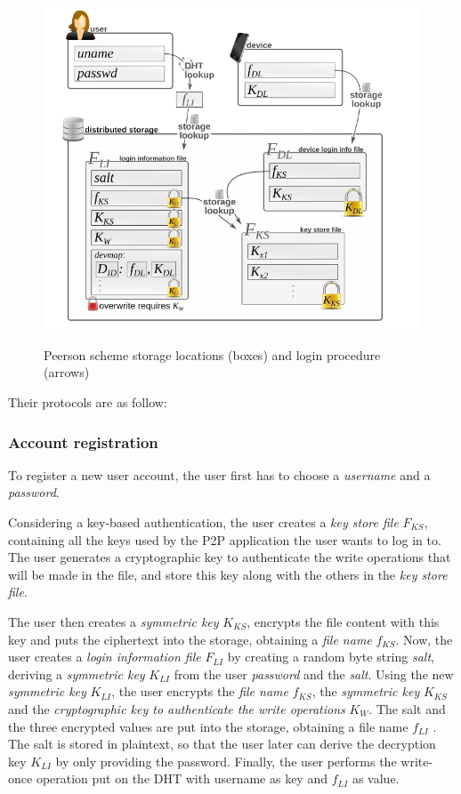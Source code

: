 \begin{figure}
\center
\includegraphics[width=12cm]{../img/password_peerson}\\
\caption{Peerson scheme storage locations (boxes) and login procedure (arrows) }
\label{fig:p2p_peerson}
\end{figure}

Their protocols are as follow:
%
\subsubsection{Account registration}
To register a new user account, the user first
has to choose a \textit{username} and a \textit{password}.

Considering a key-based authentication, the user creates a \textit{key store
file} $F_{KS}$, containing all the
keys used by the P2P application the user wants to log in to.
The user generates a cryptographic key to authenticate the write operations
that will be made in the file, and store this key along with the others in the
\textit{key store file}.

The user then creates a \textit{symmetric key} $K_{KS}$,
encrypts the file content with this key and puts the ciphertext
into the storage, obtaining a \textit{file name} $f_{KS}$. Now, the user
creates a \textit{login information file} $F_{LI}$ by creating a random
byte string \textit{salt}, deriving a \textit{symmetric key} $K_{LI}$ from the user
\textit{password} and the \textit{salt}.
Using the new \textit{ symmetric key} $K_{LI}$, the user encrypts the
\textit{file name} $f_{KS}$,
the \textit{symmetric key} $K_{KS}$ and the \textit{cryptographic key to
authenticate the write operations} $K_W$.
 The salt and the three encrypted values are put
into the storage, obtaining a file name $f_{LI}$ . The salt is stored
in plaintext, so that the user later can derive the decryption
key $K_{LI}$ by only providing the password. Finally, the user
performs the write-once operation put on the DHT with
username as key and $f_{LI}$ as value.

